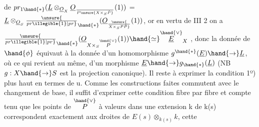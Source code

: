 de $pr_{1\hand{*}}(\underline{L}\otimes_{\underline{O}_X}\underline{O}_{\over{P}{\unsure{X\times_S\check{P}}}}(1))$ = $\underline{L}\otimes_{\underline{O}_S}\unsure{\over{pr}{\illegible{1}}|pr}_{\hand{*}}(\underline{O}_{\unsure{\over{X\times_S P}{\check{P}}}}(1))$, 
 or en vertu de III 2 on a $\unsure{\over{pr}{\illegible{1}}|pr}_{\hand{*}}(\underline{O}_{X\times_S\overset{\hand{\vee}}{P}}(1))\hand{\simeq}\overset{\hand{\vee}}{\underline{E}}_X$ , donc
la donnée de $\hand{\phi}$ équivaut à  la donnée d'un homomorphisme $g^{\hand{*}}(\underline{E})\hand{\to}\underline{L}$,
où ce qui revient au même, d'un morphisme  $\underline{E}\hand{\to} g_{\hand{*}}(\underline{L})$ (NB $g:X\hand{\to} S$ est
la projection canonique). Il reste à exprimer la condition 1º) plus
haut en termes de u. Comme les constructions faites commutent avec le
changement de base, il suffit d'exprimer cette condition fibre par fibre\hand{,}
et compte tenu que les points de $\overset{\hand{\vee}}{P}$ à valeurs dans une extension k de
k(s) correspondent exactement aux droites de $E(s)\otimes_{k(s)}k$, cette

